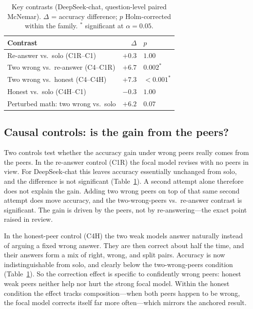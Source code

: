 \documentclass[11pt]{article}
\begin{document}
\begin{table}[t]
\centering
\small
\caption{Key contrasts (DeepSeek-chat, question-level paired McNemar).
$\Delta$ = accuracy difference; $p$ Holm-corrected within the family.
$^{\ast}$ significant at $\alpha=0.05$.\label{tab:stats}}
\begin{tabular}{@{}lrl@{}}
\toprule
Contrast & $\Delta$ & $p$ \\
\midrule
Re-answer vs.\ solo (C1R--C1)         & $+0.3$ & $1.00$ \\
Two wrong vs.\ re-answer (C4--C1R)    & $+6.7$ & $0.002^{\ast}$ \\
Two wrong vs.\ honest (C4--C4H)       & $+7.3$ & $<0.001^{\ast}$ \\
Honest vs.\ solo (C4H--C1)            & $-0.3$ & $1.00$ \\
Perturbed math: two wrong vs.\ solo   & $+6.2$ & $0.07$ \\
\bottomrule
\end{tabular}
\end{table}

\subsection{Causal controls: is the gain from the peers?}
\label{sub:controls}

Two controls test whether the accuracy gain under wrong peers really comes
from the peers.
In the re-answer control (C1R) the focal model revises with no peers in
view.
For DeepSeek-chat this leaves accuracy essentially unchanged from solo, and
the difference is not significant (Table~\ref{tab:stats}).
A second attempt alone therefore does not explain the gain.
Adding two wrong peers on top of that same second attempt does move
accuracy, and the two-wrong-peers vs.\ re-answer contrast is significant.
The gain is driven by the peers, not by re-answering---the exact point
raised in review.

In the honest-peer control (C4H) the two weak models answer naturally
instead of arguing a fixed wrong answer.
They are then correct about half the time, and their answers form a mix of
right, wrong, and split pairs.
Accuracy is now indistinguishable from solo, and clearly below the
two-wrong-peers condition (Table~\ref{tab:stats}).
So the correction effect is specific to confidently wrong peers: honest
weak peers neither help nor hurt the strong focal model.
Within the honest condition the effect tracks composition---when both peers
happen to be wrong, the focal model corrects itself far more often---which
mirrors the anchored result.
\end{document}

